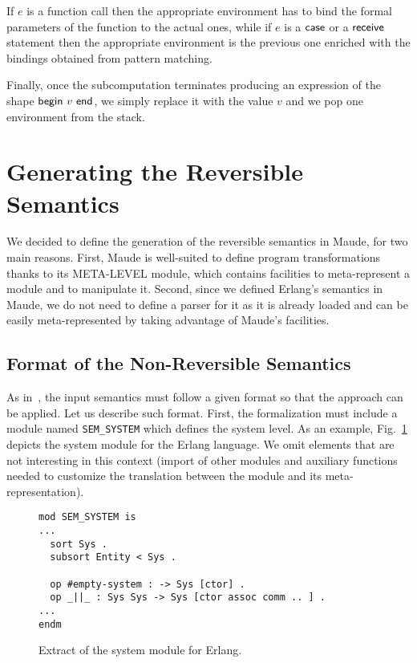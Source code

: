\documentclass{article}[12pt,a4paper]
\theoremstyle{definition}
\begin{document}
If $e$ is a function call then the
appropriate environment has to bind the formal parameters of
the function to the actual ones, while if $e$ is a $\mathsf{case}$ or a
$\mathsf{receive}$ statement then the appropriate environment is the previous one enriched
with the bindings obtained from pattern matching.

Finally, once the subcomputation terminates producing an expression of the shape $\mathsf{begin}~v~\mathsf{end}$, we simply replace it
with the value $v$ and we pop one environment from the stack. 

\section{Generating the Reversible Semantics}\label{sec:generating}
We decided to define the generation of the reversible semantics in Maude,
for two main reasons. First, Maude is well-suited to define program transformations
thanks to its META-LEVEL module, which contains facilities to meta-represent a
module and to manipulate it. Second, since we defined Erlang's semantics in
Maude, we do not need to define a parser for it as it is already loaded and can
be easily meta-represented by taking advantage of Maude's facilities.

\subsection{Format of the Non-Reversible Semantics}
As in~\cite{LaneseM20}, the input semantics must follow a given format
so that the approach can be applied.  Let us describe such
format. First, the formalization must include a module named
\verb+SEM_SYSTEM+ which defines the system level. As an example,
Fig.~\ref{fig:sem-system} depicts the system module for the Erlang
language. We omit elements that are not interesting in this context
(import of other modules and auxiliary functions needed to customize
the translation between the module and its meta-representation).

\begin{figure}[t]
\begin{Verbatim}
mod SEM_SYSTEM is 
...
  sort Sys .
  subsort Entity < Sys .

  op #empty-system : -> Sys [ctor] .
  op _||_ : Sys Sys -> Sys [ctor assoc comm .. ] .
...
endm
\end{Verbatim}
  \label{fig:sem-system}
  \caption{Extract of the system module for Erlang.}
\end{figure}
\end{document}
